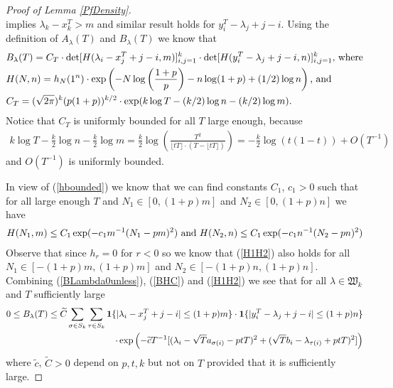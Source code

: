 \begin{proof}[Proof of Lemma \ref{PfDensity}]
\begin{equation}
\end{equation}
implies $\lambda_{k}-x_k^T>m$ and similar result holds for $y_{i}^T-\lambda_{j}+j-i$. Using the definition of $A_{\lambda}(T)$ and $B_{\lambda}(T)$ we know that
\begin{equation}{\label{BHC}}
	\begin{split}
		& B_{\lambda}(T)=C_{T}\cdot \det[H(\lambda_i-x_j^{T}+j-i,m)]_{i,j=1}^{k}\cdot\det[H(y_i^{T}-\lambda_j+j-i,n)]_{i,j=1}^{k}\text{, where}\\
		& H(N,n)=h_{N}(1^n)\cdot\exp\left(-N\log\left(\frac{1+p}{p}\right)-n\log(1+p)+(1/2)\log n\right)\text{, and}\\
		& C_T=(\sqrt{2\pi})^k (p(1+p))^{k/2}\cdot\exp(k\log T-(k/2)\log n-(k/2)\log m).
	\end{split}
\end{equation}
Notice that $C_{T}$ is uniformly bounded for all $T$ large enough, because
\begin{equation}
\begin{split}
	k\log T-\frac{k}{2}\log n-\frac{k}{2}\log m=\frac{k}{2}\log\left(\frac{T^2}{\lfloor tT \rfloor \cdot (T-\lfloor tT \rfloor)}\right)=-\frac{k}{2}\log(t(1-t))+O\left(T^{-1}\right)
\end{split}
\end{equation}
and $O\left(T^{-1}\right)$ is uniformly bounded.

In view of (\ref{hbounded}) we know that we can find constants $C_1$, $c_1>0$ such that for all large enough $T$ and $N_{1}\in[0,(1+p)m]$ and $N_2\in[0,(1+p)n]$ we have 
\begin{equation}{\label{H1H2}}
	\begin{split}
		H(N_1,m)\leq C_1\exp(-c_1 m^{-1}(N_1-pm)^2) \text{ and } H(N_2,n)\leq C_1\exp(-c_1 n^{-1}(N_2-pn)^2)
	\end{split}
\end{equation}
Observe that since $h_{r}=0$ for $r<0$ so we know that (\ref{H1H2}) also holds for all $N_1\in[-(1+p)m,(1+p)m]$ and $N_2\in[-(1+p)n,(1+p)n]$. Combining (\ref{BLambda0unless}), (\ref{BHC}) and (\ref{H1H2}) we see that for all $\lambda\in\mathfrak{W}_k$ and $T$ sufficiently large
\begin{equation}{\label{BLambdaBounded}}
	\begin{split}
		0\leq B_{\lambda}(T)\leq \widetilde{C}\sum_{\sigma\in S_{k}}\sum_{\tau\in S_{k}}\mathbf{1}\{|\lambda_i-x_j^{T}+j-i|\leq(1+p)m\}\cdot\mathbf{1}\{|y_{i}^{T}-\lambda_{j}+j-i|\leq(1+p)n\}\\
		\cdot \exp\left(-\widetilde{c}T^{-1}[(\lambda_i-\sqrt{T}a_{\sigma(i)}-ptT)^2+(\sqrt{T}b_{i}-\lambda_{\tau(i)}+ptT)^2]\right)
	\end{split}
\end{equation}
where $\widetilde{c}$, $\widetilde{C}>0$ depend on $p,t,k$ but not on $T$ provided that it is sufficiently large.


\end{proof}
